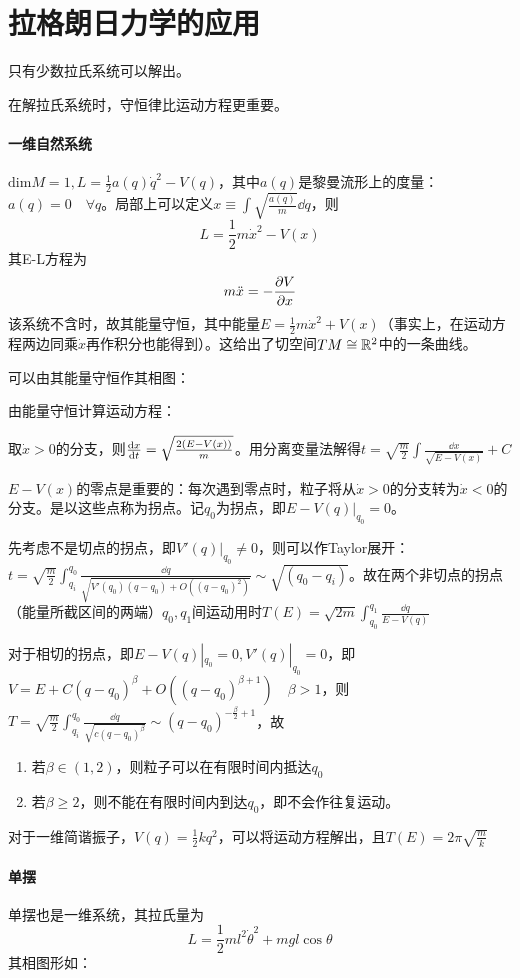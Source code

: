 \documentclass{ctexbook}
\begin{document}
\section{拉格朗日力学的应用}
只有少数拉氏系统可以解出。

在解拉氏系统时，守恒律比运动方程更重要。

\paragraph{一维自然系统}
$\mathrm{dim}M=1, L=\frac{1}{2}a(q)\dot{q}^{2}-V(q)$，其中$a(q)$是黎曼流形上的度量：$a(q)=0\quad\forall q$。局部上可以定义$x\equiv \int\sqrt{\frac{a(q)}{m}}\dd q$，则
\[L=\frac{1}{2}m\dot{x}^{2}-V(x)\]
其E-L方程为
\[m\ddot{x}=-\frac{\partial V}{\partial x}\]
该系统不含时，故其能量守恒，其中能量$E=\frac{1}{2}m\dot x^{2}+V(x)$（事实上，在运动方程两边同乘$\dot x$再作积分也能得到）。这给出了切空间$TM\cong \mathbb{R}^{2}$中的一条曲线。

可以由其能量守恒作其相图：

由能量守恒计算运动方程：

取$\dot x>0$的分支，则$\frac{\mathrm{d}x}{\mathrm{d}t}=\sqrt{\frac{2(E-V(x))}{m}}$。用分离变量法解得$t=\sqrt{\frac{m}{2}}\int\frac{\dd x}{\sqrt{E-V(x)}}+C$

$E-V(x)$的零点是重要的：每次遇到零点时，粒子将从$\dot x>0$的分支转为$\dot x<0$的分支。是以这些点称为拐点。记$q_{0}$为拐点，即$E-V(q)|_{q_{0}}=0$。

先考虑不是切点的拐点，即$V'(q)|_{q_{0}}\neq 0$，则可以作Taylor展开：$t=\sqrt{\frac m 2}\int_{q_{i}}^{q_{0}}\frac{\dd q}{\sqrt{V'(q_{0})(q-q_{0})+O((q-q_{0})^{2})}}\sim \sqrt{(q_{0}-q_{i})}$。故在两个非切点的拐点（能量所截区间的两端）$q_{0},q_{1}$间运动用时$T(E)=\sqrt{2m}\int_{q_{0}}^{q_{1}}\frac{\dd q}{E-V(q)}$

对于相切的拐点，即$E-V(q)|_{q_{0}}=0, V'(q)|_{q_{0}}=0$，即$V=E+C(q-q_{0})^{\beta}+O((q-q_{0})^{\beta+1})\quad\beta>1$，则$T=\sqrt{\frac m 2}\int_{q_{i}}^{q_{0}}\frac{\dd q}{\sqrt{c(q-q_{0})^{\beta}}}\sim (q-q_{0})^{-\frac{\beta}{2}+1}$，故
\begin{enumerate}
\item 若$\beta\in (1,2)$，则粒子可以在有限时间内抵达$q_{0}$
\item 若$\beta\geq 2$，则不能在有限时间内到达$q_{0}$，即不会作往复运动。
\end{enumerate}

对于一维简谐振子，$V(q)=\frac{1}{2}kq^{2}$，可以将运动方程解出，且$T(E)=2\pi\sqrt{\frac{m}{k}}$

\paragraph{单摆}
单摆也是一维系统，其拉氏量为
\[L=\frac{1}{2}ml^{2}{\dot{\theta}}^{2}+mgl\cos\theta\]
其相图形如：
\end{document}
